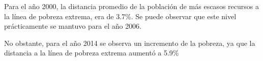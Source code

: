 Para el año 2000, la distancia promedio de la población de más escasos recursos a la línea de pobreza extrema, era de 3.7\%. Se puede observar que este nivel prácticamente se mantuvo para el año 2006. 

No obstante, para el año 2014 se observa un incremento de la pobreza, ya que la distancia a la línea de pobreza extrema aumentó a 5.9\%